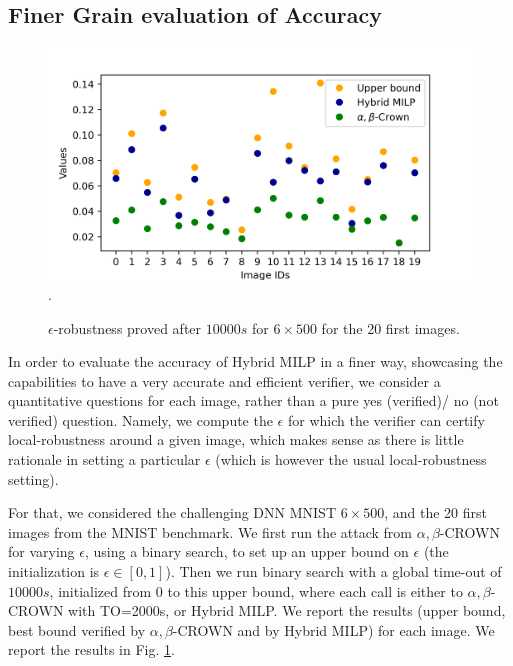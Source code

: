 \iffalse
\subsection{Finer Grain evaluation of Accuracy}

\begin{figure}[b!]
	\begin{centering}
\includegraphics[scale=0.6]{epsilon.png}.
\caption{$\epsilon$-robustness proved after $10 000s$ for $6 \times 500$ for the 20 first images.}
\label{fig2}
	\end{centering}
\end{figure}

In order to evaluate the accuracy of Hybrid MILP in a finer way, showcasing 
the capabilities to have a very accurate and efficient verifier, we consider
a quantitative questions for each image, rather than a pure yes (verified)/ no (not verified) question. Namely, we compute the $\epsilon$ for which the verifier can certify local-robustness around a given image, which makes sense as there is little rationale in setting a particular $\epsilon$ (which is however the usual local-robustness setting).

For that, we considered the challenging DNN MNIST $6 \times 500$, and the 20 first images from the MNIST benchmark. We first run the attack from $\alpha,\beta$-CROWN for varying $\epsilon$, using a binary search, to set up an upper bound on $\epsilon$ (the initialization is $\epsilon \in [0,1]$).
Then we run binary search with a global time-out of $10 000s$, initialized from $0$ to this upper bound, where each call is either to $\alpha,\beta$-CROWN with TO=2000s, or Hybrid MILP.
We report the results (upper bound, best bound verified by $\alpha,\beta$-CROWN and by Hybrid MILP) for each image. We report the results in Fig. \ref{fig2}.



